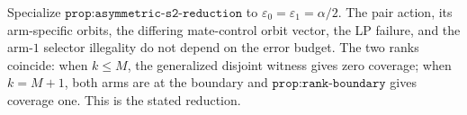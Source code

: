 Specialize \(\texttt{prop:asymmetric-s2-reduction}\) to \(\varepsilon_0=\varepsilon_1=\alpha/2\). The pair action, its arm-specific orbits, the differing mate-control orbit vector, the LP failure, and the arm-\(1\) selector illegality do not depend on the error budget. The two ranks coincide: when \(k\le M\), the generalized disjoint witness gives zero coverage; when \(k=M+1\), both arms are at the boundary and \(\texttt{prop:rank-boundary}\) gives coverage one. This is the stated reduction.